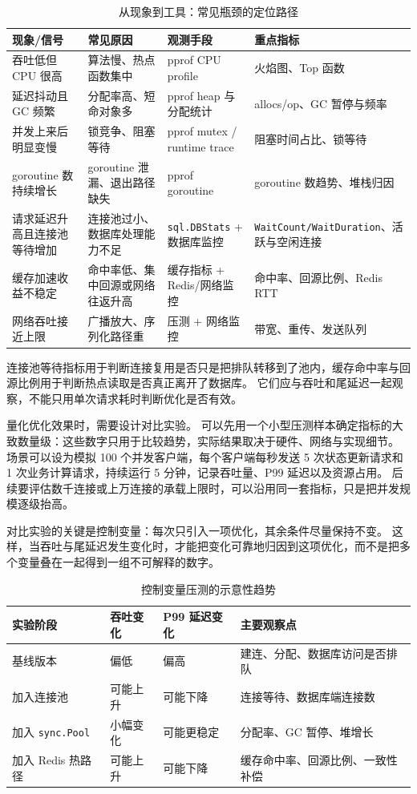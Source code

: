 \begin{table}[H]
\centering
\caption{从现象到工具：常见瓶颈的定位路径}
\label{tab:observability-tooling}
\begin{tabular}{p{3cm}p{3.6cm}p{3.8cm}p{3.2cm}}
\hline
现象/信号 & 常见原因 & 观测手段 & 重点指标 \\
\hline
吞吐低但 CPU 很高 & 算法慢、热点函数集中 & pprof CPU profile & 火焰图、Top 函数 \\
延迟抖动且 GC 频繁 & 分配率高、短命对象多 & pprof heap 与分配统计 & allocs/op、GC 暂停与频率 \\
并发上来后明显变慢 & 锁竞争、阻塞等待 & pprof mutex / runtime trace & 阻塞时间占比、锁等待 \\
goroutine 数持续增长 & goroutine 泄漏、退出路径缺失 & pprof goroutine & goroutine 数趋势、堆栈归因 \\
请求延迟升高且连接池等待增加 & 连接池过小、数据库处理能力不足 & \texttt{sql.DBStats} + 数据库监控 & \texttt{WaitCount/WaitDuration}、活跃与空闲连接 \\
缓存加速收益不稳定 & 命中率低、集中回源或网络往返升高 & 缓存指标 + Redis/网络监控 & 命中率、回源比例、Redis RTT \\
网络吞吐接近上限 & 广播放大、序列化路径重 & 压测 + 网络监控 & 带宽、重传、发送队列 \\
\hline
\end{tabular}
\end{table}

连接池等待指标用于判断连接复用是否只是把排队转移到了池内，缓存命中率与回源比例用于判断热点读取是否真正离开了数据库。
它们应与吞吐和尾延迟一起观察，不能只用单次请求耗时判断优化是否有效。

量化优化效果时，需要设计对比实验。
可以先用一个小型压测样本确定指标的大致数量级：这些数字只用于比较趋势，实际结果取决于硬件、网络与实现细节。
场景可以设为模拟 100 个并发客户端，每个客户端每秒发送 5 次状态更新请求和 1 次业务计算请求，持续运行 5 分钟，记录吞吐量、P99 延迟以及资源占用。
后续要评估数千连接或上万连接的承载上限时，可以沿用同一套指标，只是把并发规模逐级抬高。

对比实验的关键是控制变量：每次只引入一项优化，其余条件尽量保持不变。
这样，当吞吐与尾延迟发生变化时，才能把变化可靠地归因到这项优化，而不是把多个变量叠在一起得到一组不可解释的数字。

\begin{table}[H]
\centering
\caption{控制变量压测的示意性趋势}
\label{tab:optimization-trend}
\begin{tabular}{p{3.4cm}p{3cm}p{3cm}p{3.6cm}}
\hline
实验阶段 & 吞吐变化 & P99 延迟变化 & 主要观察点 \\
\hline
基线版本 & 偏低 & 偏高 & 建连、分配、数据库访问是否排队 \\
加入连接池 & 可能上升 & 可能下降 & 连接等待、数据库端连接数 \\
加入 \texttt{sync.Pool} & 小幅变化 & 可能更稳定 & 分配率、GC 暂停、堆增长 \\
加入 Redis 热路径 & 可能上升 & 可能下降 & 缓存命中率、回源比例、一致性补偿 \\
\hline
\end{tabular}
\end{table}

